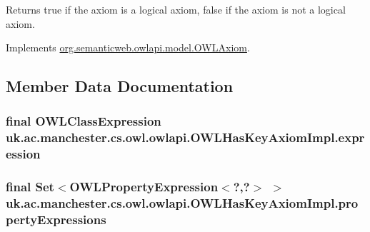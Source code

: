 \begin{DoxyReturn}{Returns}
{\ttfamily true} if the axiom is a logical axiom, {\ttfamily false} if the axiom is not a logical axiom. 
\end{DoxyReturn}


Implements \hyperlink{interfaceorg_1_1semanticweb_1_1owlapi_1_1model_1_1_o_w_l_axiom_a418ae7ad8e90290ef5b05e13ec777054}{org.\-semanticweb.\-owlapi.\-model.\-O\-W\-L\-Axiom}.



\subsection{Member Data Documentation}
\hypertarget{classuk_1_1ac_1_1manchester_1_1cs_1_1owl_1_1owlapi_1_1_o_w_l_has_key_axiom_impl_a355e5d0b0423e63ff9bb68f4e46c6c1a}{
\subsubsection[{expression}]{\setlength{\rightskip}{0pt plus 5cm}final {\bf O\-W\-L\-Class\-Expression} uk.\-ac.\-manchester.\-cs.\-owl.\-owlapi.\-O\-W\-L\-Has\-Key\-Axiom\-Impl.\-expression\hspace{0.3cm}{\ttfamily [private]}}}\label{classuk_1_1ac_1_1manchester_1_1cs_1_1owl_1_1owlapi_1_1_o_w_l_has_key_axiom_impl_a355e5d0b0423e63ff9bb68f4e46c6c1a}
\hypertarget{classuk_1_1ac_1_1manchester_1_1cs_1_1owl_1_1owlapi_1_1_o_w_l_has_key_axiom_impl_a296ff7ecb945f70f3c9cd48ae13bb0e3}{
\subsubsection[{property\-Expressions}]{\setlength{\rightskip}{0pt plus 5cm}final Set$<$O\-W\-L\-Property\-Expression$<$?,?$>$ $>$ uk.\-ac.\-manchester.\-cs.\-owl.\-owlapi.\-O\-W\-L\-Has\-Key\-Axiom\-Impl.\-property\-Expressions\hspace{0.3cm}{\ttfamily [private]}}}\label{classuk_1_1ac_1_1manchester_1_1cs_1_1owl_1_1owlapi_1_1_o_w_l_has_key_axiom_impl_a296ff7ecb945f70f3c9cd48ae13bb0e3}
